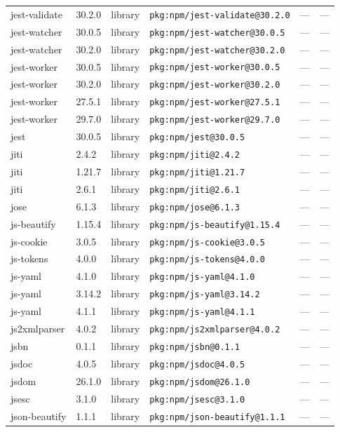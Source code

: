 \documentclass[11pt]{article}
\begin{document}
\begin{longtable}{|l|l|l|p{2.2cm}|l|p{4cm}|}
jest-validate & 30.2.0 & library & \texttt{pkg:npm/jest-validate@30.2.0} & — & — \\
jest-watcher & 30.0.5 & library & \texttt{pkg:npm/jest-watcher@30.0.5} & — & — \\
jest-watcher & 30.2.0 & library & \texttt{pkg:npm/jest-watcher@30.2.0} & — & — \\
jest-worker & 30.0.5 & library & \texttt{pkg:npm/jest-worker@30.0.5} & — & — \\
jest-worker & 30.2.0 & library & \texttt{pkg:npm/jest-worker@30.2.0} & — & — \\
jest-worker & 27.5.1 & library & \texttt{pkg:npm/jest-worker@27.5.1} & — & — \\
jest-worker & 29.7.0 & library & \texttt{pkg:npm/jest-worker@29.7.0} & — & — \\
jest & 30.0.5 & library & \texttt{pkg:npm/jest@30.0.5} & — & — \\
jiti & 2.4.2 & library & \texttt{pkg:npm/jiti@2.4.2} & — & — \\
jiti & 1.21.7 & library & \texttt{pkg:npm/jiti@1.21.7} & — & — \\
jiti & 2.6.1 & library & \texttt{pkg:npm/jiti@2.6.1} & — & — \\
jose & 6.1.3 & library & \texttt{pkg:npm/jose@6.1.3} & — & — \\
js-beautify & 1.15.4 & library & \texttt{pkg:npm/js-beautify@1.15.4} & — & — \\
js-cookie & 3.0.5 & library & \texttt{pkg:npm/js-cookie@3.0.5} & — & — \\
js-tokens & 4.0.0 & library & \texttt{pkg:npm/js-tokens@4.0.0} & — & — \\
js-yaml & 4.1.0 & library & \texttt{pkg:npm/js-yaml@4.1.0} & — & — \\
js-yaml & 3.14.2 & library & \texttt{pkg:npm/js-yaml@3.14.2} & — & — \\
js-yaml & 4.1.1 & library & \texttt{pkg:npm/js-yaml@4.1.1} & — & — \\
js2xmlparser & 4.0.2 & library & \texttt{pkg:npm/js2xmlparser@4.0.2} & — & — \\
jsbn & 0.1.1 & library & \texttt{pkg:npm/jsbn@0.1.1} & — & — \\
jsdoc & 4.0.5 & library & \texttt{pkg:npm/jsdoc@4.0.5} & — & — \\
jsdom & 26.1.0 & library & \texttt{pkg:npm/jsdom@26.1.0} & — & — \\
jsesc & 3.1.0 & library & \texttt{pkg:npm/jsesc@3.1.0} & — & — \\
json-beautify & 1.1.1 & library & \texttt{pkg:npm/json-beautify@1.1.1} & — & — \\

\end{longtable}
\end{document}
